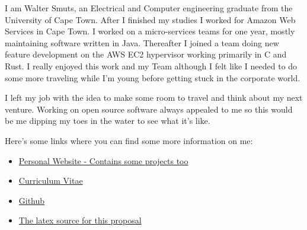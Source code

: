 I am Walter Smuts, an Electrical and Computer engineering graduate from the
University of Cape Town. After I finished my studies I worked for Amazon Web
Services in Cape Town. I worked on a micro-services teams for one year, mostly
maintaining software written in Java. Thereafter I joined a team doing new feature
development on the AWS EC2 hypervisor working primarily in C and Rust. I really
enjoyed this work and my Team although I felt like I needed to do some more
traveling while I'm young before getting stuck in the corporate world.

I left my job with the idea to make some room to travel and think about my next
venture. Working on open source software always appealed to me so this would be me
dipping my toes in the water to see what it's like.

Here's some links where you can find some more information on me:
\begin{itemize}
\item \href{https://www.waltersmuts.com}{Personal Website - Contains some projects too}
\item \href{https://www.waltersmuts.com/Walter\%20Smuts\%20-\%20Curriculum\%20Vitae.pdf}{Curriculum Vitae}
\item \href{https://github.com/WalterSmuts}{Github}
\item \href{https://github.com/WalterSmuts/2022-summer-of-code-proposals}{The latex source for this proposal}
\end{itemize}
